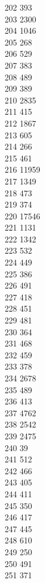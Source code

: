 { 202	393 \\
 203	2300 \\
 204	1046 \\
 205	268 \\
 206	529 \\
 207	383 \\
 208	489 \\
 209	389 \\
 210	2835 \\
 211	415 \\
 212	1867 \\
 213	605 \\
 214	266 \\
 215	461 \\
 216	11959 \\
 217	1349 \\
 218	473 \\
 219	374 \\
 220	17546 \\
 221	1131 \\
 222	1342 \\
 223	532 \\
 224	449 \\
 225	386 \\
 226	491 \\
 227	418 \\
 228	451 \\
 229	481 \\
 230	364 \\
 231	468 \\
 232	459 \\
 233	378 \\
 234	2678 \\
 235	489 \\
 236	413 \\
 237	4762 \\
 238	2542 \\
 239	2475 \\
 240	39 \\
 241	512 \\
 242	466 \\
 243	405 \\
 244	411 \\
 245	350 \\
 246	417 \\
 247	445 \\
 248	610 \\
 249	250 \\
 250	491 \\
 251	371 \\
}
